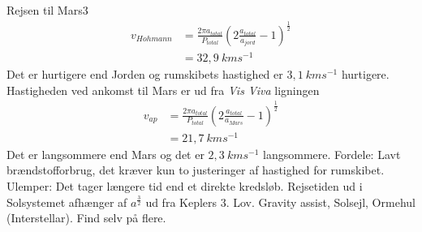 \begin{opgave}{Rejsen til Mars}{3}
\begin{align*}
v_{Hohmann} &= \frac{2\pi a_{total}}{P_{total}} \left( 2 \frac{a_{total}}{a_{jord}} -1\right) ^{\frac{1}{2}}\\
&=32,9~\si{km} \si{s}^{-1}
\end{align*}
\opg Det er hurtigere end Jorden og rumskibets hastighed er $3,1~\si{km} \si{s}^{-1}$ hurtigere. 
\opg Hastigheden ved ankomst til Mars er ud fra \textsl{Vis Viva} ligningen
\begin{align*}
v_{ap} &= \frac{2\pi a_{total}}{P_{total}} \left( 2 \frac{a_{total}}{a_{Mars}} -1\right) ^{\frac{1}{2}}\\
&=21,7~\si{km} \si{s^{-1}}
\end{align*}
\opg Det er langsommere end Mars og det er $2,3~\si{km} \si{s^{-1}}$ langsommere.
\opg Fordele: Lavt brændstofforbrug, det kræver kun to justeringer af hastighed for rumskibet.\\
Ulemper: Det tager længere tid end et direkte kredsløb.
\opg Rejsetiden ud i Solsystemet afhænger af $a^{\frac{3}{2}}$ ud fra Keplers 3. Lov. 
\opg Gravity assist, Solsejl, Ormehul (Interstellar). Find selv på flere.  
\end{opgave}



